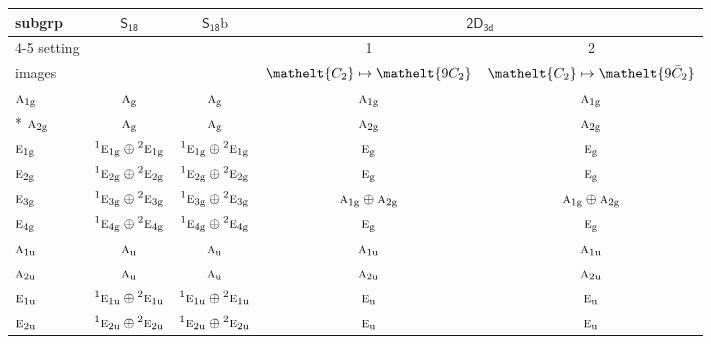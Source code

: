 \documentclass[10pt,a4paper]{article}
\numberwithin{equation}{section}
\newcommand{\eltfont}[1]{{\let\sigma\eltsigma\mathelt{#1}}}
\newcommand{\grp}[1]{\mathsf{#1}}
\newcommand{\irr}[1]{\text{\normalfont\scshape #1}}
\newcommand{\conjpair}[1]{{}^{#1}}
\newcommand{\cls}[1]{\eltfont{#1}}
\newcommand{\ptag}[1]{\mathrm{#1}}
\newcommand{\barred}[1]{\bar{#1}}
\newcommand{\secondclass}{\mathrm{b}}
\begin{document}
{\small\begin{longtable}{@{}lcccc@{}}\toprule
subgrp & \href{S18.pdf}{$\grp{S_{18}}$} & \href{S18b.pdf}{$\grp{S_{18}}\secondclass$} & \multicolumn{2}{c}{\href{2D3d.pdf}{$\grp{2D_{3d}}$}}\\\cmidrule(lr){4-5}
setting &  &  & 1 & 2\\
images &  &  & {\scriptsize $\cls{C_{2}} \mapsto \cls{9C_{2}}$} & {\scriptsize $\cls{C_{2}} \mapsto \cls{9\barred{C}_{2}}$}\\\midrule\endhead
\bottomrule\endfoot\endlastfoot
$\irr{a}_{1\ptag{g}}$ & $\irr{a}_{\ptag{g}}$ & $\irr{a}_{\ptag{g}}$ & $\irr{a}_{1\ptag{g}}$ & $\irr{a}_{1\ptag{g}}$\\*
$\irr{a}_{2\ptag{g}}$ & $\irr{a}_{\ptag{g}}$ & $\irr{a}_{\ptag{g}}$ & $\irr{a}_{2\ptag{g}}$ & $\irr{a}_{2\ptag{g}}$\\
$\irr{e}_{1\ptag{g}}$ & $\conjpair{1}\irr{e}_{1\ptag{g}}\oplus \conjpair{2}\irr{e}_{1\ptag{g}}$ & $\conjpair{1}\irr{e}_{1\ptag{g}}\oplus \conjpair{2}\irr{e}_{1\ptag{g}}$ & $\irr{e}_{\ptag{g}}$ & $\irr{e}_{\ptag{g}}$\\
$\irr{e}_{2\ptag{g}}$ & $\conjpair{1}\irr{e}_{2\ptag{g}}\oplus \conjpair{2}\irr{e}_{2\ptag{g}}$ & $\conjpair{1}\irr{e}_{2\ptag{g}}\oplus \conjpair{2}\irr{e}_{2\ptag{g}}$ & $\irr{e}_{\ptag{g}}$ & $\irr{e}_{\ptag{g}}$\\
$\irr{e}_{3\ptag{g}}$ & $\conjpair{1}\irr{e}_{3\ptag{g}}\oplus \conjpair{2}\irr{e}_{3\ptag{g}}$ & $\conjpair{1}\irr{e}_{3\ptag{g}}\oplus \conjpair{2}\irr{e}_{3\ptag{g}}$ & $\irr{a}_{1\ptag{g}}\oplus \irr{a}_{2\ptag{g}}$ & $\irr{a}_{1\ptag{g}}\oplus \irr{a}_{2\ptag{g}}$\\
$\irr{e}_{4\ptag{g}}$ & $\conjpair{1}\irr{e}_{4\ptag{g}}\oplus \conjpair{2}\irr{e}_{4\ptag{g}}$ & $\conjpair{1}\irr{e}_{4\ptag{g}}\oplus \conjpair{2}\irr{e}_{4\ptag{g}}$ & $\irr{e}_{\ptag{g}}$ & $\irr{e}_{\ptag{g}}$\\
$\irr{a}_{1\ptag{u}}$ & $\irr{a}_{\ptag{u}}$ & $\irr{a}_{\ptag{u}}$ & $\irr{a}_{1\ptag{u}}$ & $\irr{a}_{1\ptag{u}}$\\
$\irr{a}_{2\ptag{u}}$ & $\irr{a}_{\ptag{u}}$ & $\irr{a}_{\ptag{u}}$ & $\irr{a}_{2\ptag{u}}$ & $\irr{a}_{2\ptag{u}}$\\
$\irr{e}_{1\ptag{u}}$ & $\conjpair{1}\irr{e}_{1\ptag{u}}\oplus \conjpair{2}\irr{e}_{1\ptag{u}}$ & $\conjpair{1}\irr{e}_{1\ptag{u}}\oplus \conjpair{2}\irr{e}_{1\ptag{u}}$ & $\irr{e}_{\ptag{u}}$ & $\irr{e}_{\ptag{u}}$\\
$\irr{e}_{2\ptag{u}}$ & $\conjpair{1}\irr{e}_{2\ptag{u}}\oplus \conjpair{2}\irr{e}_{2\ptag{u}}$ & $\conjpair{1}\irr{e}_{2\ptag{u}}\oplus \conjpair{2}\irr{e}_{2\ptag{u}}$ & $\irr{e}_{\ptag{u}}$ & $\irr{e}_{\ptag{u}}$\\

\end{longtable}}
\end{document}
